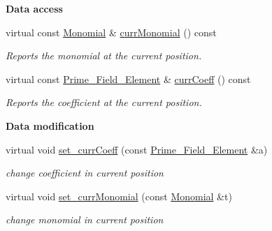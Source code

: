 \begin{Indent}\textbf{ Data access}\par
\begin{DoxyCompactItemize}
\item 
\mbox{\label{class_mutable___constant___polynomial___iterator_ad8108ec082f95640d464e4a94e977059}} 
virtual const \hyperlink{class_monomial}{Monomial} \& \hyperlink{class_mutable___constant___polynomial___iterator_ad8108ec082f95640d464e4a94e977059}{curr\+Monomial} () const
\begin{DoxyCompactList}\small\item\em Reports the monomial at the current position. \end{DoxyCompactList}\item 
\mbox{\label{class_mutable___constant___polynomial___iterator_adc7fbded21d873195a2fe927cd305280}} 
virtual const \hyperlink{class_prime___field___element}{Prime\+\_\+\+Field\+\_\+\+Element} \& \hyperlink{class_mutable___constant___polynomial___iterator_adc7fbded21d873195a2fe927cd305280}{curr\+Coeff} () const
\begin{DoxyCompactList}\small\item\em Reports the coefficient at the current position. \end{DoxyCompactList}\end{DoxyCompactItemize}
\end{Indent}
\begin{Indent}\textbf{ Data modification}\par
\begin{DoxyCompactItemize}
\item 
\mbox{\label{class_mutable___constant___polynomial___iterator_ae864f1773d2b2dd81805ed3ffc594bf4}} 
virtual void \hyperlink{class_mutable___constant___polynomial___iterator_ae864f1773d2b2dd81805ed3ffc594bf4}{set\+\_\+curr\+Coeff} (const \hyperlink{class_prime___field___element}{Prime\+\_\+\+Field\+\_\+\+Element} \&a)
\begin{DoxyCompactList}\small\item\em change coefficient in current position \end{DoxyCompactList}\item 
\mbox{\label{class_mutable___constant___polynomial___iterator_a3e76572d5efc981a275b55c083670834}} 
virtual void \hyperlink{class_mutable___constant___polynomial___iterator_a3e76572d5efc981a275b55c083670834}{set\+\_\+curr\+Monomial} (const \hyperlink{class_monomial}{Monomial} \&t)
\begin{DoxyCompactList}\small\item\em change monomial in current position \end{DoxyCompactList}\end{DoxyCompactItemize}
\end{Indent}
